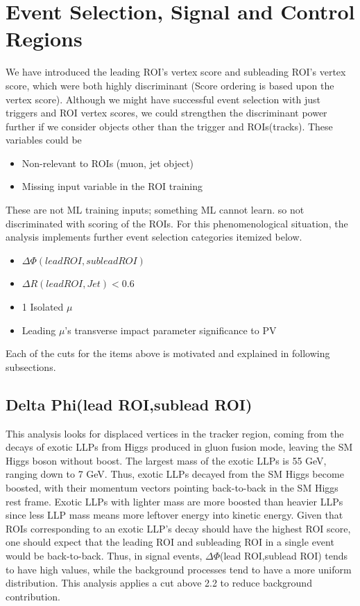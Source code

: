 \clearpage
\chapter{Event Selection, Signal and Control Regions}\label{sec:selections}
We have introduced the leading ROI's vertex score and subleading ROI's vertex score, which were both highly discriminant (Score ordering is based upon the vertex score).
Although we might have successful event selection with just triggers and ROI vertex scores, we could strengthen the discriminant power further if we consider objects other than the trigger and ROIs(tracks).
These variables could be
\begin{itemize}
 \item Non-relevant to ROIs (muon, jet object)
 \item Missing input variable in the ROI training
\end{itemize}
These are not ML training inputs; something ML cannot learn.
so not discriminated with scoring of the ROIs.
For this phenomenological situation, the analysis implements further event selection categories itemized below.
\begin{itemize}
  \item $\Delta\Phi(lead ROI,sublead ROI)$ 
  \item $\Delta R(lead ROI, Jet)<$0.6 
  \item 1 Isolated $\mu$
  \item Leading $\mu$'s transverse impact parameter significance to PV
\end{itemize}

Each of the cuts for the items above is motivated and explained in following subsections.

\section{Delta Phi(lead ROI,sublead ROI)}\label{sec:DeltaPhi}
This analysis looks for displaced vertices in the tracker region, coming from the decays of exotic LLPs from Higgs produced in gluon fusion mode, leaving the SM Higgs boson without boost.
The largest mass of the exotic LLPs is 55 GeV, ranging down to 7 GeV.
Thus, exotic LLPs decayed from the SM Higgs become boosted, with their momentum vectors pointing back-to-back in the SM Higgs rest frame.
Exotic LLPs with lighter mass are more boosted than heavier LLPs since less LLP mass means more leftover energy into kinetic energy.
Given that ROIs corresponding to an exotic LLP's decay should have the highest ROI score, one should expect that the leading ROI and subleading ROI in a single event would be back-to-back.
Thus, in signal events, $\Delta\Phi$(lead ROI,sublead ROI) tends to have high values, while the background processes tend to have a more uniform distribution.
This analysis applies a cut above 2.2 to reduce background contribution.

